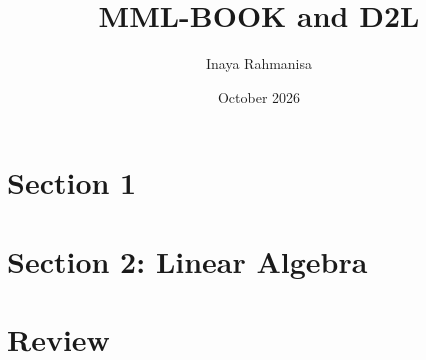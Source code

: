 \documentclass{article}
\title{MML-BOOK and D2L}
\author{Inaya Rahmanisa}
\date{October 2026}
\begin{document}
\maketitle

\section{Section 1}

\section{Section 2: Linear Algebra}


\section{Review}

\end{document}
